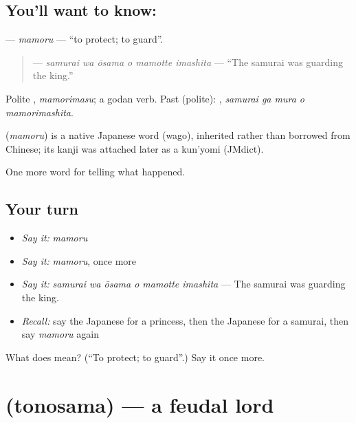 \subsection*{You'll want to know: }
\textbf{} — \emph{mamoru} — \textquotedblleft{}to protect; to guard\textquotedblright{}.

\begin{quote}
\textbf{  } — \emph{samurai wa ōsama o mamotte imashita} — \textquotedblleft{}The samurai was guarding the king.\textquotedblright{}
\end{quote}

Polite \textbf{}, \emph{mamorimasu}; a godan verb. Past (polite): \textbf{  }, \emph{samurai ga mura o mamorimashita}.

\begin{cousinweb}
\textbf{} (\emph{mamoru}) is a native Japanese word (wago), inherited rather than borrowed from Chinese; its kanji was attached later as a kun'yomi (JMdict).
\end{cousinweb}

\begin{grammarlens}[title={What you've built}]
One more word for telling what happened.
\end{grammarlens}

\subsection*{Your turn}
\begin{itemize}
\raggedright
  \item \emph{Say it:} \emph{mamoru}
  \item \emph{Say it:} \emph{mamoru}, once more
  \item \emph{Say it:} \emph{samurai wa ōsama o mamotte imashita} — The samurai was guarding the king.
  \item \emph{Recall:} say the Japanese for a princess, then the Japanese for a samurai, then say \emph{mamoru} again
\end{itemize}

\begin{tcolorbox}[breakable,colback=teal!4,colframe=teal!35!black,title={Before you move on}]
What does  mean? (\textquotedblleft{}To protect; to guard\textquotedblright{}.) Say it once more.
\end{tcolorbox}
\section[\texorpdfstring{\ja{とのさま} (tonosama)}{とのさま (tonosama)}]{ (tonosama) — a feudal lord}

